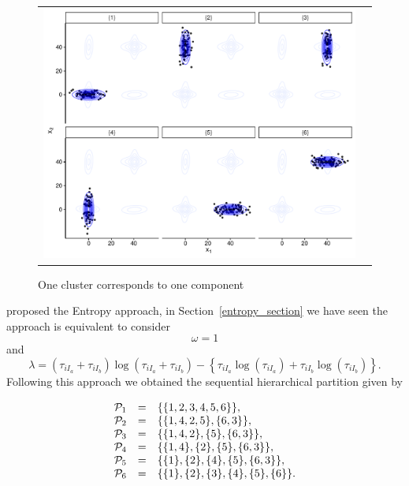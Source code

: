 \documentclass[submit]{smj}
\theoremstyle{definition}
\begin{document}
\begin{figure}[h]
\begin{center}
\begin{tabular}{cc}
  \includegraphics[width=\textwidth]{figures/partition-example-part6.pdf} \\
 \end{tabular}
 \caption{One cluster corresponds to one component}\label{ex_one_one}
\end{center}
\end{figure}

\cite{baudry2010combining} proposed the Entropy approach, in Section~\ref{entropy_section} we have seen the approach is equivalent to consider \[\omega = 1\] and \[\lambda = (\tau_{iI_a}+\tau_{iI_b}) \log(\tau_{iI_a} + \tau_{iI_b}) - \left\{ \tau_{iI_a} \log(\tau_{iI_a}) + \tau_{iI_b} \log(\tau_{iI_b}) \right\}.\] Following this approach we obtained the sequential hierarchical partition given by 

\begin{equation}
\begin{array}{r c l}
\mathcal{P}_1 &=& \{\{1, 2, 3, 4, 5, 6\}\}, \\
\mathcal{P}_2 &=& \{\{1, 4, 2, 5\}, \{6, 3\} \},  \\
\mathcal{P}_3 &=& \{\{1, 4, 2\}, \{5\}, \{6, 3\} \}, \\
\mathcal{P}_4 &=& \{\{1, 4\},\{2\}, \{5\}, \{6, 3\} \}, \\
\mathcal{P}_5 &=& \{\{1\},\{2\},\{4\},\{5\},\{6,3\} \},\\
\mathcal{P}_6 &=& \{\{1\},\{2\},\{3\},\{4\},\{5\},\{6\}\}.
\end{array}
\label{hier_ex}
\end{equation}
\end{document}

